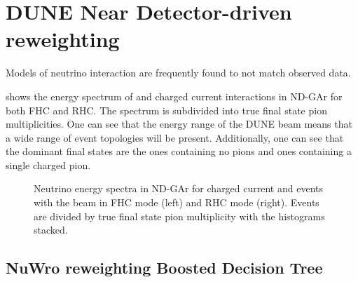 \chapter{DUNE Near Detector-driven reweighting}
\label{sec:dune_ndrwt}

Models of neutrino interaction are frequently found to not match observed data.



 shows the energy spectrum of \numu and \anumu charged current interactions in ND-GAr for both FHC and RHC.
The spectrum is subdivided into true final state pion multiplicities. 
One can see that the energy range of the DUNE beam means that a wide range of event topologies will be present.
Additionally, one can see that the dominant final states are the ones containing no pions and ones containing a single charged pion.

\begin{figure}[h]
	\begin{minipage}[t]{.5\linewidth}
		\begin{adjustbox}{max totalsize=\linewidth, center}
				
		\end{adjustbox}
	\end{minipage}
	\hfill
	\begin{minipage}[t]{.5\linewidth}
		\begin{adjustbox}{max totalsize=\linewidth, center}
				
		\end{adjustbox}
	\end{minipage}
	\caption[Neutrino energy spectrum in ND-GAr divided by pion multiplicity]{Neutrino energy spectra in ND-GAr for charged current \numu and \anumu events with the beam in FHC mode (left) and RHC mode (right). Events are divided by true final state pion multiplicity with the histograms stacked.}
	\label{fig:energyByMode}
\end{figure}

\section{NuWro reweighting Boosted Decision Tree}
\label{sec:dune_ndrwt:bdt}


